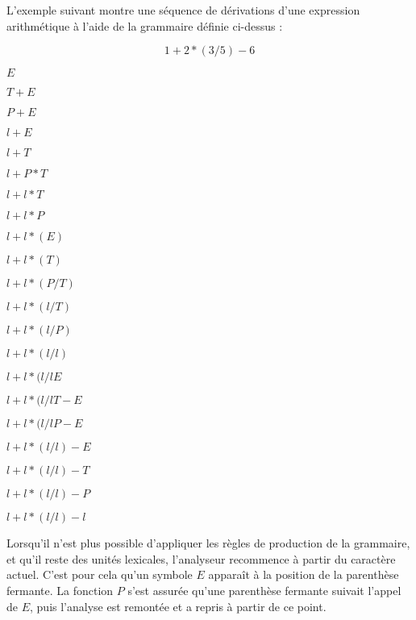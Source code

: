 L'exemple suivant montre une séquence de dérivations d'une expression
arithmétique à l'aide de la grammaire définie ci-dessus :

\begin{equation}
1+2*(3/5)-6
\end{equation}

\begin{center}
\begin{minipage}{0.8\textwidth}
  \begin{enumerate}
    \setlength{\itemsep}{0pt}
    \setlength{\parskip}{0pt}
    \begin{multicols}{2}
      \item $E$
      \item $T+E$
      \item $P+E$
      \item $l+E$
      \item $l+T$
      \item $l+P*T$
      \item $l+l*T$
      \item $l+l*P$
      \item $l+l*(E)$
      \item $l+l*(T)$
      \item $l+l*(P/T)$
      \item $l+l*(l/T)$
      \item $l+l*(l/P)$
      \item $l+l*(l/l)$
      \item $l+l*(l/lE$
      \item $l+l*(l/lT-E$
      \item $l+l*(l/lP-E$
      \item $l+l*(l/l)-E$
      \item $l+l*(l/l)-T$
      \item $l+l*(l/l)-P$
      \item $l+l*(l/l)-l$
    \end{multicols}
  \end{enumerate}
\end{minipage}
\end{center}

Lorsqu'il n'est plus possible d'appliquer les règles de production de la
grammaire, et qu'il reste des unités lexicales, l'analyseur recommence à
partir du caractère actuel. C’est pour cela qu’un symbole $E$ apparaît à la
position de la parenthèse fermante. La fonction $P$ s’est assurée qu’une
parenthèse fermante suivait l’appel de $E$, puis l'analyse est remontée et a
repris à partir de ce point.

